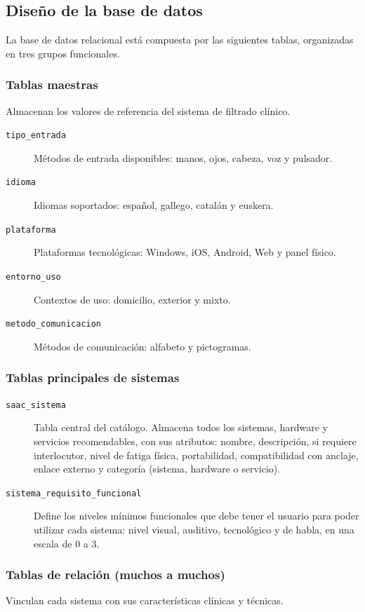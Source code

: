 \subsection{Diseño de la base de datos}
La base de datos relacional está compuesta por las siguientes tablas, organizadas en tres grupos funcionales.

\subsubsection{Tablas maestras}
Almacenan los valores de referencia del sistema de filtrado clínico.

\begin{description}
	\item[\texttt{tipo\_entrada}] Métodos de entrada disponibles: manos, ojos, cabeza, voz y pulsador.
	\item[\texttt{idioma}] Idiomas soportados: español, gallego, catalán y euskera.
	\item[\texttt{plataforma}] Plataformas tecnológicas: Windows, iOS, Android, Web y panel físico.
	\item[\texttt{entorno\_uso}] Contextos de uso: domicilio, exterior y mixto.
	\item[\texttt{metodo\_comunicacion}] Métodos de comunicación: alfabeto y pictogramas.
\end{description}

\subsubsection{Tablas principales de sistemas}
\begin{description}
	\item[\texttt{saac\_sistema}] Tabla central del catálogo. Almacena todos los sistemas, hardware y servicios recomendables, con sus atributos: nombre, descripción, si requiere interlocutor, nivel de fatiga física, portabilidad, compatibilidad con anclaje, enlace externo y categoría 			(sistema, hardware o servicio).
	\item[\texttt{sistema\_requisito\_funcional}] Define los niveles mínimos funcionales que debe tener el usuario para poder utilizar cada sistema: nivel visual, auditivo, tecnológico y de habla, en una escala de 0 a 3.
\end{description}

\subsubsection{Tablas de relación (muchos a muchos)}
Vinculan cada sistema con sus características clínicas y técnicas.

